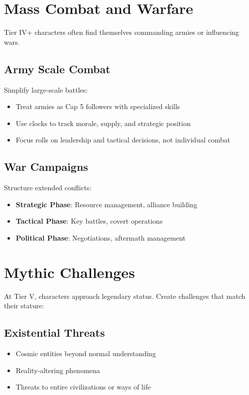 \section{Mass Combat and Warfare}

Tier IV+ characters often find themselves commanding armies or influencing wars.

\subsection*{Army Scale Combat}

Simplify large-scale battles:
\begin{itemize}
    \item Treat armies as Cap 5 followers with specialized skills
    \item Use clocks to track morale, supply, and strategic position
    \item Focus rolls on leadership and tactical decisions, not individual combat
\end{itemize}

\subsection*{War Campaigns}

Structure extended conflicts:
\begin{itemize}
    \item \textbf{Strategic Phase}: Resource management, alliance building
    \item \textbf{Tactical Phase}: Key battles, covert operations
    \item \textbf{Political Phase}: Negotiations, aftermath management
\end{itemize}

\section{Mythic Challenges}

At Tier V, characters approach legendary status. Create challenges that match their stature:

\subsection*{Existential Threats}

\begin{itemize}
    \item Cosmic entities beyond normal understanding
    \item Reality-altering phenomena
    \item Threats to entire civilizations or ways of life
\end{itemize}

